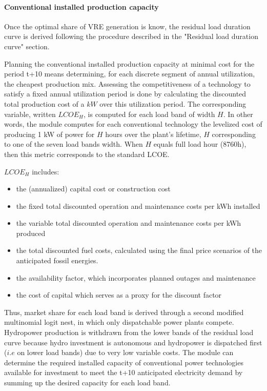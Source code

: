 \paragraph{Conventional installed production capacity}

Once the optimal share of VRE generation is know, the residual load duration curve is derived following the procedure described in the "Residual load duration curve" section.



Planning the conventional installed production capacity at minimal cost for the period t+10 means determining, for each discrete segment of annual utilization, the cheapest production mix.
Assessing the competitiveness of a technology to satisfy a fixed annual utilization period is done by calculating the discounted total production cost of a
$kW$ over this utilization period.
The corresponding variable, written $LCOE_{H}$, is computed for each load band of width $H$. In other words, the module computes for each conventional technology the levelized cost of producing 1 kW of power for $H$ hours over the plant's lifetime, $H$ corresponding to one of the seven load bands width. When $H$ equals full load hour (8760h), then this metric corresponds to the standard LCOE.

$LCOE_{H}$ includes:

\begin{itemize}
    \item the (annualized) capital cost or construction cost
    \item the fixed total discounted operation and maintenance costs per kWh installed
    \item the variable total discounted operation and maintenance costs per kWh produced
    \item the total discounted fuel costs, calculated using the final price scenarios of the anticipated fossil energies.
    \item  the availability factor, which incorporates planned outages and maintenance
    \item the cost of capital which serves as a proxy for the discount factor
\end{itemize}



Thus, market share for each load band is derived through a second modified multinomial logit nest, in which only dispatchable power plants compete. Hydropower production is withdrawn from the  lower bands of the residual load curve because hydro investment is autonomous and hydropower is dispatched first ($i.e$ on lower load bands) due to very low variable costs. The module can determine the required installed capacity of conventional power technologies available for investment to meet the t+10 anticipated electricity demand by summing up the desired capacity for each load band.

